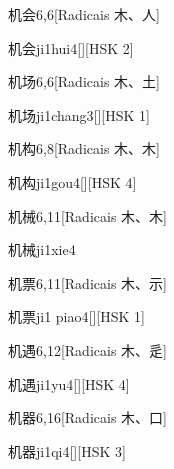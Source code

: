 \begin{entry}{机会}{6,6}[Radicais ⽊、⼈]
  \begin{phonetics}{机会}{ji1hui4}[][HSK 2]
  \end{phonetics}
\end{entry}

\begin{entry}{机场}{6,6}[Radicais ⽊、⼟]
  \begin{phonetics}{机场}{ji1chang3}[][HSK 1]
  \end{phonetics}
\end{entry}

\begin{entry}{机构}{6,8}[Radicais ⽊、⽊]
  \begin{phonetics}{机构}{ji1gou4}[][HSK 4]
  \end{phonetics}
\end{entry}

\begin{entry}{机械}{6,11}[Radicais ⽊、⽊]
  \begin{phonetics}{机械}{ji1xie4}
  \end{phonetics}
\end{entry}

\begin{entry}{机票}{6,11}[Radicais ⽊、⽰]
  \begin{phonetics}{机票}{ji1 piao4}[][HSK 1]
  \end{phonetics}
\end{entry}

\begin{entry}{机遇}{6,12}[Radicais ⽊、⾡]
  \begin{phonetics}{机遇}{ji1yu4}[][HSK 4]
  \end{phonetics}
\end{entry}

\begin{entry}{机器}{6,16}[Radicais ⽊、⼝]
  \begin{phonetics}{机器}{ji1qi4}[][HSK 3]
  \end{phonetics}
\end{entry}

